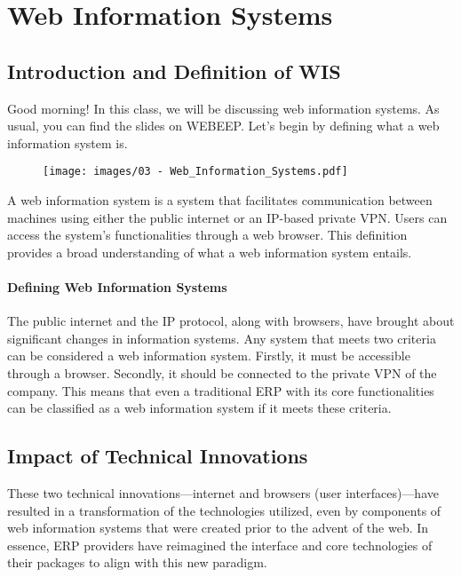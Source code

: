 \section{Web Information Systems}

\subsection{Introduction and Definition of WIS}\label{introduction-to-web-information-systems}

Good morning! In this class, we will be discussing web information
systems. As usual, you can find the slides on WEBEEP. Let's begin by
defining what a web information system is.

\begin{figure}[!h]
  \centering
  \texttt{[image: images/03 - Web\_Information\_Systems.pdf]}
\end{figure}

A web information system is a system that facilitates communication
between machines using either the public internet or an IP-based private
VPN. Users can access the system's functionalities through a web
browser. This definition provides a broad understanding of what a web
information system entails.

\paragraph*{Defining Web Information Systems}
The public internet and the IP protocol, along with browsers, have
brought about significant changes in information systems. Any system
that meets two criteria can be considered a web information system.
Firstly, it must be accessible through a browser. Secondly, it should be
connected to the private VPN of the company. This means that even a
traditional ERP with its core functionalities can be classified as a web
information system if it meets these criteria.


\subsection{Impact of Technical Innovations}
These two technical
innovations---internet and browsers (user interfaces)---have resulted in a transformation of the technologies
utilized, even by components of web information systems that were
created prior to the advent of the web. In essence, ERP providers have
reimagined the interface and core technologies of their packages to
align with this new paradigm.

